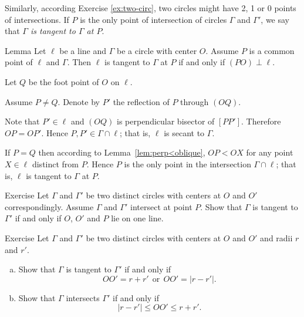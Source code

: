 Similarly, according Exercise \ref{ex:two-circ},
two circles might have 2, 1 or 0 points of intersections.
If $P$ is the only point of intersection of circles $\Gamma$ and $\Gamma'$,
we say that \emph{$\Gamma$ is tangent to $\Gamma$ at $P$}. 

\begin{thm}{Lemma}\label{lem:tangent}
Let $\ell$ be a line and $\Gamma$ be a circle with center $O$.
Assume $P$ is a common point of $\ell$ and $\Gamma$. 
Then $\ell$ is tangent to $\Gamma$ at $P$ if and only if $(PO)\perp \ell$.
\end{thm}

Let $Q$ be the foot point of $O$ on $\ell$.

Assume $P\ne Q$.
Denote by $P'$ the reflection of $P$ through $(OQ)$.

Note that $P'\in\ell$ and $(OQ)$ is perpendicular bisector of $[PP']$.
Therefore $OP=OP'$.
Hence $P,P'\in \Gamma\cap \ell$;
that is, $\ell$ is  secant to $\Gamma$.

If $P=Q$ then according to Lemma~\ref{lem:perp<oblique},
$OP<OX$ for any point $X\in \ell$ distinct from $P$.
Hence $P$ is the only point in the intersection $\Gamma\cap\ell$;
that is, $\ell$ is tangent to $\Gamma$ at $P$. 
\qeds

\begin{thm}{Exercise}\label{ex:tangent-circles}
Let $\Gamma$ and $\Gamma'$ be two distinct circles with centers at $O$ and $O'$ correspondingly. 
Assume $\Gamma$ and $\Gamma'$ intersect at point $P$.
Show that $\Gamma$ is tangent to $\Gamma'$ if and only if $O$, $O'$ and $P$ lie on one line.
\end{thm}

\begin{thm}{Exercise}\label{ex:tangent-circles-2}
Let $\Gamma$ and $\Gamma'$ be two distinct circles with centers at $O$ and $O'$ and radii $r$ and $r'$.

\begin{enumerate}[(a)]
\item\label{ex:tangent-circles-2:a} Show that $\Gamma$ is tangent to $\Gamma'$ if and only if $$OO'=r+r'\ \ \text{or}\ \  OO'=|r-r'|.$$
\item \label{ex:tangent-circles-2:b}
Show that $\Gamma$ intersects $\Gamma'$ if and only if
$$|r-r'|\le OO'\le r+r'.$$
\end{enumerate}

\end{thm}

